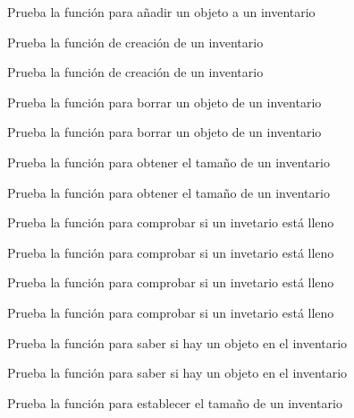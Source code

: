 \begin{DoxyRefList}
Prueba la función para añadir un objeto a un inventario  
\item[\label{test__test000168}%
\Hypertarget{test__test000168}%
Member \hyperlink{inventory__test_8h_a73a6080c360a8870c4ffc734e989c8b3}{test2\+\_\+inventory\+\_\+create} ()]Prueba la función de creación de un inventario 

Prueba la función de creación de un inventario  
\item[\label{test__test000170}%
\Hypertarget{test__test000170}%
Member \hyperlink{inventory__test_8h_a7df95a4c69353ae9bf0766e3d13672f8}{test2\+\_\+inventory\+\_\+delete\+\_\+object} ()]Prueba la función para borrar un objeto de un inventario 

Prueba la función para borrar un objeto de un inventario  
\item[\label{test__test000181}%
\Hypertarget{test__test000181}%
Member \hyperlink{inventory__test_8h_ab003abf4af7d055f6b9370618327cc81}{test2\+\_\+inventory\+\_\+get\+\_\+size} ()]Prueba la función para obtener el tamaño de un inventario 

Prueba la función para obtener el tamaño de un inventario  
\item[\label{test__test000177}%
\Hypertarget{test__test000177}%
Member \hyperlink{inventory__test_8h_a4d2a2a4d4ba59446d013debfe9bf05dc}{test2\+\_\+inventory\+\_\+is\+\_\+empty} ()]Prueba la función para comprobar si un invetario está lleno 

Prueba la función para comprobar si un invetario está lleno  
\item[\label{test__test000175}%
\Hypertarget{test__test000175}%
Member \hyperlink{inventory__test_8h_a1c9e567d4919d5aaccc9580815a8a81d}{test2\+\_\+inventory\+\_\+is\+\_\+full} ()]Prueba la función para comprobar si un invetario está lleno 

Prueba la función para comprobar si un invetario está lleno  
\item[\label{test__test000179}%
\Hypertarget{test__test000179}%
Member \hyperlink{inventory__test_8h_a837cf990de86a6b23ef85b04b8b4dec1}{test2\+\_\+inventory\+\_\+is\+\_\+object\+\_\+in} ()]Prueba la función para saber si hay un objeto en el inventario 

Prueba la función para saber si hay un objeto en el inventario  
\item[\label{test__test000183}%
\Hypertarget{test__test000183}%
Member \hyperlink{inventory__test_8h_a2d387a2e82970e625baae0ac4c610acc}{test2\+\_\+inventory\+\_\+set\+\_\+size} ()]Prueba la función para establecer el tamaño de un inventario 


\end{DoxyRefList}
